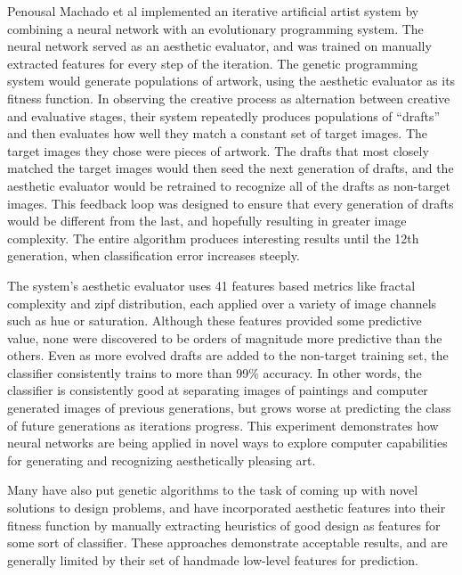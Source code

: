 \documentclass[midd]{thesis}
\begin{document}
Penousal Machado et al \cite{machado2008experiments} implemented an iterative artificial artist system by combining a neural network with an evolutionary programming system. The neural network served as an aesthetic evaluator, and was trained on manually extracted features for every step of the iteration. The genetic programming system would generate populations of artwork, using the aesthetic evaluator as its fitness function. In observing the creative process as alternation between creative and evaluative stages, their system repeatedly produces populations of ``drafts'' and then evaluates how well they match a constant set of target images. The target images they chose were pieces of artwork. The drafts that most closely matched the target images would then seed the next generation of drafts, and the aesthetic evaluator would be retrained to recognize all of the drafts as non-target images. This feedback loop was designed to ensure that every generation of drafts would be different from the last, and hopefully resulting in greater image complexity. The entire algorithm produces interesting results until the 12th generation, when classification error increases steeply.

The system's aesthetic evaluator uses 41 features based metrics like fractal complexity and zipf distribution, each applied over a variety of image channels such as hue or saturation. Although these features provided some predictive value, none were discovered to be orders of magnitude more predictive than the others. Even as more evolved drafts are added to the non-target training set, the classifier consistently trains to more than 99\% accuracy. In other words, the classifier is consistently good at separating images of paintings and computer generated images of previous generations, but grows worse at predicting the class of future generations as iterations progress. This experiment demonstrates how neural networks are being applied in novel ways to explore computer capabilities for generating and recognizing aesthetically pleasing art. %

Many have also put genetic algorithms to the task of coming up with novel solutions to design problems, and have incorporated aesthetic features into their fitness function by manually extracting heuristics of good design as features for some sort of classifier. These approaches demonstrate acceptable results, and are generally limited by their set of handmade low-level features for prediction. %
\end{document}
